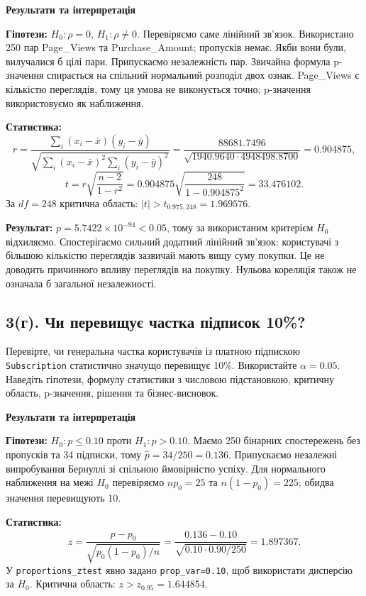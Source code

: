 \documentclass[11pt,a4paper]{article}
\newcommand{\pythoncode}[1]{%
  \Needspace{6\baselineskip}
  \begin{tcolorbox}[enhanced,breakable,colback=black!2!white,colframe=black!15!white,
    colbacktitle=black!6!white,coltitle=accent,fonttitle=\bfseries\small,
    title=Код Python,title after break={Код Python (продовження)},boxrule=0.4pt,arc=1mm,left=2mm,right=2mm,top=2mm,bottom=2mm,
    before skip=6pt,after skip=8pt]
  
  \end{tcolorbox}}
\newcommand{\answerheading}{\Needspace{4\baselineskip}\par\medskip
  {\color{answergreen}\bfseries Результати та інтерпретація}\par\smallskip}
\begin{document}
\pythoncode{part3-cell10}
\answerheading
\textbf{Гіпотези:} \(H_0:\rho=0\), \(H_1:\rho\ne0\). Перевіряємо саме лінійний зв'язок. Використано 250 пар Page\_Views та Purchase\_Amount; пропусків немає. Якби вони були, вилучалися б цілі пари. Припускаємо незалежність пар. Звичайна формула p-значення спирається на спільний нормальний розподіл двох ознак. Page\_Views є кількістю переглядів, тому ця умова не виконується точно; p-значення використовуємо як наближення.

\textbf{Статистика:} \[r=\frac{\sum_i(x_i-\bar x)(y_i-\bar y)}{\sqrt{\sum_i(x_i-\bar x)^2\sum_i(y_i-\bar y)^2}}
=\frac{88681.7496}{\sqrt{1940.9640\cdot4948498.8700}}=0.904875,\] \[t=r\sqrt{\frac{n-2}{1-r^2}}=0.904875\sqrt{\frac{248}{1-0.904875^2}}=33.476102.\] За \(df=248\) критична область: \(|t|>t_{0.975,248}=1.969576\).

\textbf{Результат:} \(p=5.7422\times 10^{-94}<0.05\), тому за використаним критерієм \(H_0\) відхиляємо. Спостерігаємо сильний додатний лінійний зв'язок: користувачі з більшою кількістю переглядів зазвичай мають вищу суму покупки. Це не доводить причинного впливу переглядів на покупку. Нульова кореляція також не означала б загальної незалежності.
\subsection*{3(г). Чи перевищує частка підписок 10\%?}
\begin{taskstatement}
Перевірте, чи генеральна частка користувачів із платною підпискою \texttt{Subscription} статистично значущо перевищує 10\%.
Використайте $\alpha=0.05$. Наведіть гіпотези, формулу статистики з числовою підстановкою, критичну область, p-значення, рішення та бізнес-висновок.
\end{taskstatement}


\pythoncode{part3-cell13}
\answerheading
\textbf{Гіпотези:} \(H_0:p\le0.10\) проти \(H_1:p>0.10\). Маємо 250 бінарних спостережень без пропусків та 34 підписки, тому \(\widehat p=34/250=0.136\). Припускаємо незалежні випробування Бернуллі зі спільною ймовірністю успіху. Для нормального наближення на межі \(H_0\) перевіряємо \(np_0=25\) та \(n(1-p_0)=225\); обидва значення перевищують 10.

\textbf{Статистика:} \[z=\frac{\widehat p-p_0}{\sqrt{p_0(1-p_0)/n}}
=\frac{0.136-0.10}{\sqrt{0.10\cdot0.90/250}}=1.897367.\] У \texttt{proportions\_ztest} явно задано \texttt{prop\_var=0.10}, щоб використати дисперсію за \(H_0\). Критична область: \(z>z_{0.95}=1.644854\).
\end{document}
